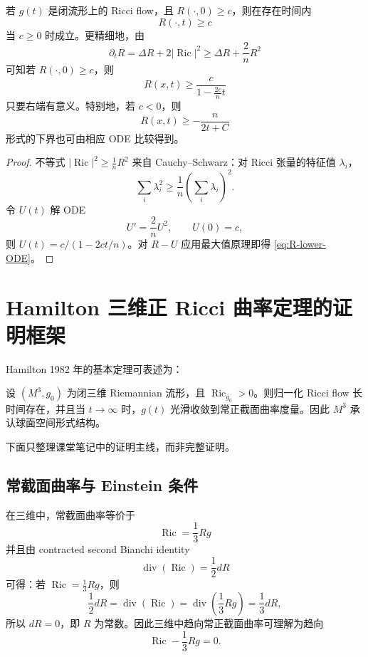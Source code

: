 \documentclass[11pt,a4paper,cn,nofont,math=cm,mode=fancy,bibtex]{elegantbook}
\numberwithin{equation}{chapter}
\numberwithin{figure}{chapter}
\newcommand{\Ric}{\operatorname{Ric}}
\newcommand{\divg}{\operatorname{div}}
\newcommand{\norm}[1]{\left\lvert #1\right\rvert}
\begin{document}
\begin{cor}[标量曲率下界保持]
若 $g(t)$ 是闭流形上的 Ricci flow，且 $R(\cdot,0)\ge c$，则在存在时间内
\[
  R(\cdot,t)\ge c
\]
当 $c\ge0$ 时成立。更精细地，由
\[
  \partial_tR=\Delta R+2\norm{\Ric}^2
  \ge \Delta R+\frac{2}{n}R^2
\]
可知若 $R(\cdot,0)\ge c$，则
\begin{equation}\label{eq:R-lower-ODE}
  R(x,t)\ge \frac{c}{1-\frac{2c}{n}t}
\end{equation}
只要右端有意义。特别地，若 $c<0$，则
\[
  R(x,t)\ge -\frac{n}{2t+C}
\]
形式的下界也可由相应 ODE 比较得到。
\end{cor}

\begin{proof}
不等式 $\norm{\Ric}^2\ge \frac1nR^2$ 来自 Cauchy--Schwarz：对 Ricci 张量的特征值 $\lambda_i$，
\[
  \sum_i\lambda_i^2\ge\frac1n\left(\sum_i\lambda_i\right)^2.
\]
令 $U(t)$ 解 ODE
\[
  U'=\frac{2}{n}U^2,
  \qquad U(0)=c,
\]
则 $U(t)=c/(1-2ct/n)$。对 $R-U$ 应用最大值原理即得 \eqref{eq:R-lower-ODE}。
\end{proof}

\chapter{Hamilton 三维正 Ricci 曲率定理的证明框架}

Hamilton 1982 年的基本定理可表述为：

\begin{thm}
设 $(M^3,g_0)$ 为闭三维 Riemannian 流形，且 $\Ric_{g_0}>0$。则归一化 Ricci flow 长时间存在，并且当 $t\to\infty$ 时，$g(t)$ 光滑收敛到常正截面曲率度量。因此 $M^3$ 承认球面空间形式结构。
\end{thm}

下面只整理课堂笔记中的证明主线，而非完整证明。

\section{常截面曲率与 Einstein 条件}

在三维中，常截面曲率等价于
\begin{equation}\label{eq:constant-curv-ric}
  \Ric=\frac13 Rg
\end{equation}
并且由 contracted second Bianchi identity
\[
  \divg(\Ric)=\frac12 dR
\]
可得：若 $\Ric=\frac13Rg$，则
\[
  \frac12 dR=\divg(\Ric)=\divg\left(\frac13 Rg\right)=\frac13 dR,
\]
所以 $dR=0$，即 $R$ 为常数。因此三维中趋向常正截面曲率可理解为趋向
\[
  \Ric-\frac13 Rg=0.
\]
\end{document}
